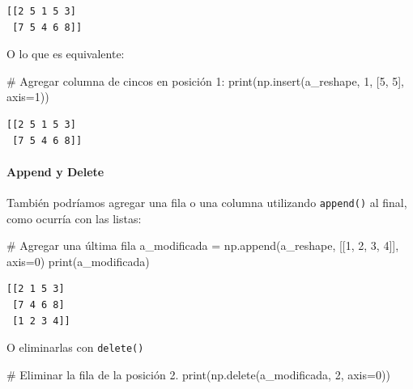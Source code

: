 \documentclass[
  letterpaper,
  DIV=11,
  numbers=noendperiod]{scrreprt}
\let\oldparagraph\paragraph
\renewcommand{\paragraph}[1]{\oldparagraph{#1}\mbox{}}
\newenvironment{Shaded}{\begin{snugshade}}{\end{snugshade}}
\newcommand{\BuiltInTok}[1]{\textcolor[rgb]{0.00,0.23,0.31}{#1}}
\newcommand{\CommentTok}[1]{\textcolor[rgb]{0.37,0.37,0.37}{#1}}
\newcommand{\DecValTok}[1]{\textcolor[rgb]{0.68,0.00,0.00}{#1}}
\newcommand{\NormalTok}[1]{\textcolor[rgb]{0.00,0.23,0.31}{#1}}
\newcommand{\OperatorTok}[1]{\textcolor[rgb]{0.37,0.37,0.37}{#1}}
\begin{document}
\begin{verbatim}
[[2 5 1 5 3]
 [7 5 4 6 8]]
\end{verbatim}

O lo que es equivalente:

\begin{Shaded}
\begin{Highlighting}[]
\CommentTok{\# Agregar columna de cincos en posición 1:}
\BuiltInTok{print}\NormalTok{(np.insert(a\_reshape, }\DecValTok{1}\NormalTok{, [}\DecValTok{5}\NormalTok{, }\DecValTok{5}\NormalTok{], axis}\OperatorTok{=}\DecValTok{1}\NormalTok{))}
\end{Highlighting}
\end{Shaded}

\begin{verbatim}
[[2 5 1 5 3]
 [7 5 4 6 8]]
\end{verbatim}

\paragraph{Append y Delete}\label{append-y-delete}

También podríamos agregar una fila o una columna utilizando
\texttt{append()} al final, como ocurría con las listas:

\begin{Shaded}
\begin{Highlighting}[]
\CommentTok{\# Agregar una última fila}
\NormalTok{a\_modificada }\OperatorTok{=}\NormalTok{ np.append(a\_reshape, [[}\DecValTok{1}\NormalTok{, }\DecValTok{2}\NormalTok{, }\DecValTok{3}\NormalTok{, }\DecValTok{4}\NormalTok{]], axis}\OperatorTok{=}\DecValTok{0}\NormalTok{)}
\BuiltInTok{print}\NormalTok{(a\_modificada)}
\end{Highlighting}
\end{Shaded}

\begin{verbatim}
[[2 1 5 3]
 [7 4 6 8]
 [1 2 3 4]]
\end{verbatim}

O eliminarlas con \texttt{delete()}

\begin{Shaded}
\begin{Highlighting}[]
\CommentTok{\# Eliminar la fila de la posición 2.}
\BuiltInTok{print}\NormalTok{(np.delete(a\_modificada, }\DecValTok{2}\NormalTok{, axis}\OperatorTok{=}\DecValTok{0}\NormalTok{))}
\end{Highlighting}
\end{Shaded}
\end{document}
